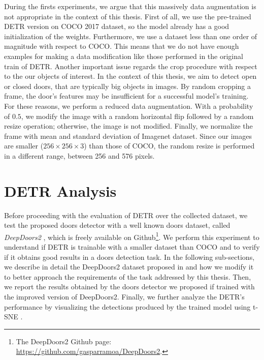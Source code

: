 During the firsts experiments, we argue that this massively data augmentation is not appropriate in the context of this thesis. First of all, we use the pre-trained DETR version on COCO 2017 dataset, so the model already has a good initialization of the weights. Furthermore, we use a dataset less than one order of magnitude with respect to COCO. This means that we do not have enough examples for making a data modification like those performed in the original train of DETR. Another important issue regards the crop procedure with respect to the our objects of interest. In the context of this thesis, we aim to detect open or closed doors, that are typically big objects in images. By random cropping a frame, the door's features may be insufficient for a successful model's training. For these reasons, we perform a reduced data augmentation. With a probability of $0.5$, we modify the image with a random horizontal flip followed by a random resize operation; otherwise, the image is not modified. Finally, we normalize the frame with mean and standard deviation of Imagenet dataset. Since our images are smaller ($256 \times 256 \times 3$) than those of COCO, the random resize is performed in a different range, between 256 and 576 pixels. 

\section{DETR Analysis}

Before proceeding with the evaluation of DETR over the collected dataset, we test the proposed doors detector with a well known doors dataset, called \textit{DeepDoors2} \cite{deepdoors2}, which is freely available on Github\footnote{The DeepDoors2 Github page: \url{https://github.com/gasparramoa/DeepDoors2}.}. We perform this experiment to understand if DETR is trainable with a smaller dataset than COCO and to verify if it obtains good results in a doors detection task. In the following sub-sections, we describe in detail the DeepDoors2 dataset proposed in \cite{deepdoors2} and how we modify it to better approach the requirements of the task addressed by this thesis. Then, we report the results obtained by the doors detector we proposed if trained with the improved version of DeepDoors2. Finally, we further analyze the DETR's performance by visualizing the detections produced by the trained model using t-SNE \cite{tsne}.

